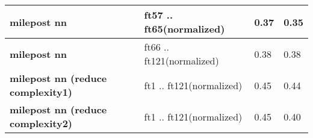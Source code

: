 \begin{tabular}{|l|p{1.2in}|p{0.9in}|p{0.9in}|}
     \hline
      \textbf{ milepost nn } &  ft57 .. ft65\newline(normalized)  &  0.37  &  0.35 \\
     \hline
      \textbf{ milepost nn } &  ft66 .. ft121\newline(normalized)  &  0.38  &  0.38 \\
     \hline
      \textbf{ milepost nn (reduce complexity1) } &  ft1 .. ft121\newline(normalized)  &  0.45  &  0.44 \\
     \hline
      \textbf{ milepost nn (reduce complexity2) } &  ft1 .. ft121\newline(normalized)  &  0.45  &  0.40 \\
     \hline
    \end{tabular}    